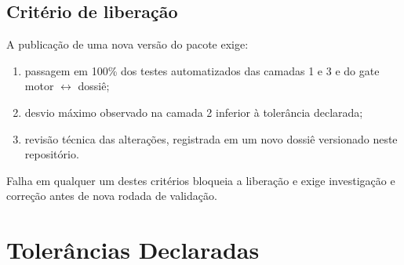 \documentclass[11pt,a4paper]{article}
\begin{document}
\subsection{Critério de liberação}

A publicação de uma nova versão do pacote exige:

\begin{enumerate}
  \item passagem em 100\% dos testes automatizados das camadas 1 e 3 e do gate motor \(\leftrightarrow\) dossiê;
  \item desvio máximo observado na camada 2 inferior à tolerância declarada;
  \item revisão técnica das alterações, registrada em um novo dossiê versionado neste repositório.
\end{enumerate}

Falha em qualquer um destes critérios bloqueia a liberação e exige investigação e correção antes de nova rodada de validação.

\section{Tolerâncias Declaradas}
\label{sec:tolerancias}
\end{document}
